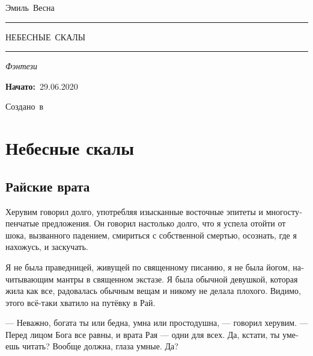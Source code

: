 \documentclass[a4paper,10pt,fleqn]{book}\usepackage{polyglossia}\setdefaultlanguage[babelshorthands=true]{russian}\setotherlanguage{english}\defaultfontfeatures{Ligatures=TeX,Mapping=tex-text}\usepackage{xcolor}\newcommand{\ml}[3]{#2}
\newcommand{\tofaauthor}{\ml{$0$}{Эмиль~Весна}{Emil~Viesn\'{a}}}
\newcommand{\tofatitle}{\ml{$0$}{НЕБЕСНЫЕ~СКАЛЫ}{The~Skycliff}}
\newcommand{\tofastarted}{29.06.2020}
\newcommand{\asterism}{\vspace{1em}{\centering\Large\bfseries$\ast~\ast~\ast$\par}\vspace{1em}}
\begin{document}
 

\begin{titlepage}
{\centering{~\par}\vspace{0.25\textheight}
{\LARGE\tofaauthor}\par
\vspace{1.0cm}\rule{17em}{1pt}\par\vspace{0.3cm}
{\Huge\textsc{\tofatitle}\par}
\vspace{0.3cm}\rule{17em}{2pt}\par\vspace{1.0cm}
{\Large\textit{\ml{$0$}{Фэнтези}{Fantasy}}\par}
\vspace{0.5cm}\asterism\par\vspace{1.0cm}
{\textbf{\ml{$0$}{Начато:}{Started:}}~\tofastarted\par}\vfill
{\Large\ml{$0$}{Создано~в}{Created~by}~\XeLaTeX}\par}
\end{titlepage}

\tableofcontents

\chapter{Небесные скалы}

\section{Райские врата}

Херувим говорил долго, употребляя изысканные восточные эпитеты и многоступенчатые предложения.
Он говорил настолько долго, что я успела отойти от шока, вызванного падением, смириться с собственной смертью, осознать, где я нахожусь, и заскучать.

Я не была праведницей, живущей по священному писанию, я не была йогом, начитывающим мантры в священном экстазе.
Я была обычной девушкой, которая жила как все, радовалась обычным вещам и никому не делала плохого.
Видимо, этого всё-таки хватило на путёвку в Рай.

--- Неважно, богата ты или бедна, умна или простодушна, --- говорил херувим.
--- Перед лицом Бога все равны, и врата Рая --- одни для всех.
Да, кстати, ты умеешь читать?
Вообще должна, глаза умные.
Да?
\end{document}
